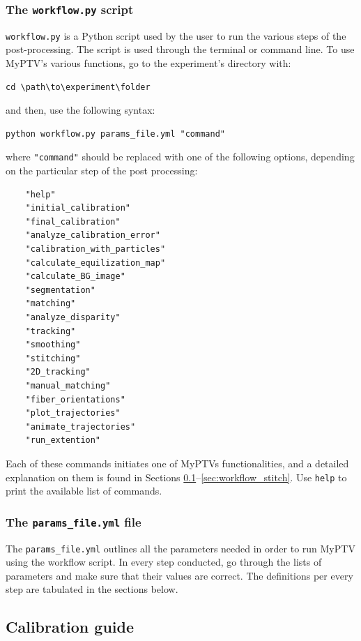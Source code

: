 \documentclass[10pt,a4paper]{article}
\begin{document}
\subsubsection{The \texttt{workflow.py} script} \label{sec:workflow_commands}

\texttt{workflow.py} is a Python script used by the user to run the various steps of the post-processing. The script is used through the terminal or command line. To use MyPTV's various functions, go to the experiment's directory with:
\begin{verbatim}
cd \path\to\experiment\folder
\end{verbatim}
%
and then, use the following syntax:
%
\begin{verbatim}
python workflow.py params_file.yml "command"
\end{verbatim}
%
where \texttt{"command"} should be replaced with one of the following options, depending on the particular step of the post processing:
%
\begin{verbatim}
	"help"
	"initial_calibration"
	"final_calibration"
	"analyze_calibration_error"
	"calibration_with_particles"
	"calculate_equilization_map"
	"calculate_BG_image"
	"segmentation"
	"matching"
	"analyze_disparity"
	"tracking"
	"smoothing"
	"stitching"
	"2D_tracking"
	"manual_matching"
	"fiber_orientations"
	"plot_trajectories"
	"animate_trajectories"
	"run_extention"
\end{verbatim}
%
Each of these commands initiates one of MyPTVs functionalities, and a detailed explanation on them is found in Sections \ref{sec:cal_guide}--\ref{sec:workflow_stitch}. Use \texttt{help} to print the available list of commands.


\subsubsection{The \texttt{params\_file.yml} file}

The \texttt{params\_file.yml} outlines all the parameters needed in order to run MyPTV using the workflow script. In every step conducted, go through the lists of parameters and make sure that their values are correct. The definitions per every step are tabulated in the sections below.







\subsection{Calibration guide} \label{sec:cal_guide}
\end{document}
